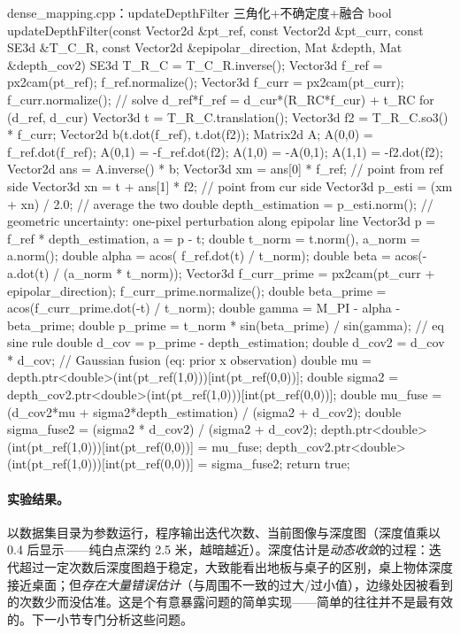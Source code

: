\begin{codebox}[C++]{dense\_mapping.cpp：updateDepthFilter 三角化+不确定度+融合}
bool updateDepthFilter(const Vector2d &pt_ref, const Vector2d &pt_curr,
    const SE3d &T_C_R, const Vector2d &epipolar_direction,
    Mat &depth, Mat &depth_cov2) {
  SE3d T_R_C = T_C_R.inverse();
  Vector3d f_ref  = px2cam(pt_ref);  f_ref.normalize();
  Vector3d f_curr = px2cam(pt_curr); f_curr.normalize();
  // solve d_ref*f_ref = d_cur*(R_RC*f_cur) + t_RC  for (d_ref, d_cur)
  Vector3d t  = T_R_C.translation();
  Vector3d f2 = T_R_C.so3() * f_curr;
  Vector2d b(t.dot(f_ref), t.dot(f2));
  Matrix2d A;
  A(0,0) = f_ref.dot(f_ref); A(0,1) = -f_ref.dot(f2);
  A(1,0) = -A(0,1);          A(1,1) = -f2.dot(f2);
  Vector2d ans = A.inverse() * b;
  Vector3d xm = ans[0] * f_ref;          // point from ref side
  Vector3d xn = t + ans[1] * f2;         // point from cur side
  Vector3d p_esti = (xm + xn) / 2.0;     // average the two
  double depth_estimation = p_esti.norm();
  // geometric uncertainty: one-pixel perturbation along epipolar line
  Vector3d p = f_ref * depth_estimation, a = p - t;
  double t_norm = t.norm(), a_norm = a.norm();
  double alpha = acos( f_ref.dot(t) / t_norm);
  double beta  = acos(-a.dot(t) / (a_norm * t_norm));
  Vector3d f_curr_prime = px2cam(pt_curr + epipolar_direction);
  f_curr_prime.normalize();
  double beta_prime = acos(f_curr_prime.dot(-t) / t_norm);
  double gamma   = M_PI - alpha - beta_prime;
  double p_prime = t_norm * sin(beta_prime) / sin(gamma);  // eq sine rule
  double d_cov   = p_prime - depth_estimation;
  double d_cov2  = d_cov * d_cov;
  // Gaussian fusion (eq: prior x observation)
  double mu     = depth.ptr<double>(int(pt_ref(1,0)))[int(pt_ref(0,0))];
  double sigma2 = depth_cov2.ptr<double>(int(pt_ref(1,0)))[int(pt_ref(0,0))];
  double mu_fuse     = (d_cov2*mu + sigma2*depth_estimation) / (sigma2 + d_cov2);
  double sigma_fuse2 = (sigma2 * d_cov2) / (sigma2 + d_cov2);
  depth.ptr<double>(int(pt_ref(1,0)))[int(pt_ref(0,0))]      = mu_fuse;
  depth_cov2.ptr<double>(int(pt_ref(1,0)))[int(pt_ref(0,0))] = sigma_fuse2;
  return true;
}
\end{codebox}

\paragraph{实验结果。}
以数据集目录为参数运行，程序输出迭代次数、当前图像与深度图（深度值乘以 0.4 后显示——纯白点深约 2.5 米，越暗越近）。深度估计是\emph{动态收敛}的过程：迭代超过一定次数后深度图趋于稳定，大致能看出地板与桌子的区别，桌上物体深度接近桌面；但\emph{存在大量错误估计}（与周围不一致的过大/过小值），边缘处因被看到的次数少而没估准\cite{gaoxiang2019slam14}。这是个有意暴露问题的简单实现——简单的往往并不是最有效的。下一小节专门分析这些问题。


